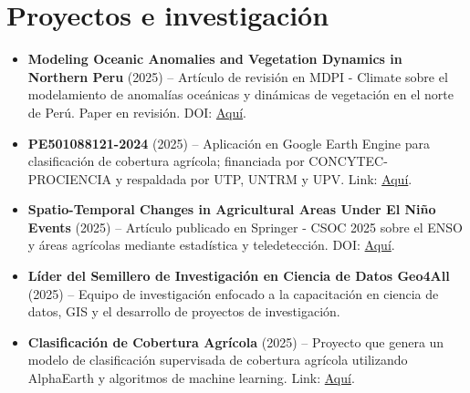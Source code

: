 \documentclass[11pt,a4paper]{article}
\begin{document}
\section*{Proyectos e investigación}
\begin{itemize}[left=15pt]
  \item \textbf{Modeling Oceanic Anomalies and Vegetation Dynamics in Northern Peru} (2025) -- Artículo de revisión en MDPI - Climate sobre el modelamiento de anomalías oceánicas y dinámicas de vegetación en el norte de Perú. Paper en revisión. DOI: \href{https://www.mdpi.com/2673-7086/6/1/22}{Aquí}.
  \item \textbf{PE501088121-2024} (2025) -- Aplicación en Google Earth Engine para clasificación de cobertura agrícola; financiada por CONCYTEC-PROCIENCIA y respaldada por UTP, UNTRM y UPV. Link: \href{https://ee-hsluis4326.projects.earthengine.app/view/utpndvivstsm}{Aquí}.
  \item \textbf{Spatio-Temporal Changes in Agricultural Areas Under El Niño Events} (2025) -- Artículo publicado en Springer - CSOC 2025 sobre el ENSO y áreas agrícolas mediante estadística y teledetección. DOI: \href{https://doi.org/10.1007/978-3-032-04581-2_25}{Aquí}.
  \item \textbf{Líder del Semillero de Investigación en Ciencia de Datos Geo4All} (2025) -- Equipo de investigación enfocado a la capacitación en ciencia de datos, GIS y el desarrollo de proyectos de investigación.
  \item \textbf{Clasificación de Cobertura Agrícola} (2025) -- Proyecto que genera un modelo de clasificación supervisada de cobertura agrícola utilizando AlphaEarth y algoritmos de machine learning. Link: \href{https://github.com/1nfinit0/AlphaEarth-RandomForest-classifier---Lambayeque}{Aquí}.
\end{itemize}
\newpage
\end{document}
